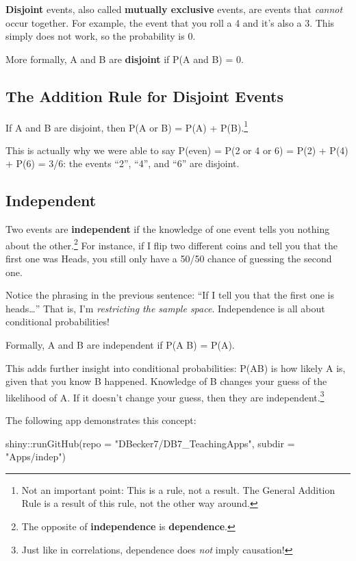 \documentclass[
  letterpaper,
  DIV=11,
  numbers=noendperiod]{scrreprt}
\newenvironment{Shaded}{\begin{snugshade}}{\end{snugshade}}
\newcommand{\AttributeTok}[1]{\textcolor[rgb]{0.40,0.45,0.13}{#1}}
\newcommand{\FunctionTok}[1]{\textcolor[rgb]{0.28,0.35,0.67}{#1}}
\newcommand{\NormalTok}[1]{\textcolor[rgb]{0.00,0.23,0.31}{#1}}
\newcommand{\SpecialCharTok}[1]{\textcolor[rgb]{0.37,0.37,0.37}{#1}}
\newcommand{\StringTok}[1]{\textcolor[rgb]{0.13,0.47,0.30}{#1}}
\begin{document}
\textbf{Disjoint} events, also called \textbf{mutually exclusive}
events, are events that \emph{cannot} occur together. For example, the
event that you roll a 4 and it's also a 3. This simply does not work, so
the probability is 0.

More formally, A and B are \textbf{disjoint} if P(A and B) = 0.

\hypertarget{the-addition-rule-for-disjoint-events}{%
\subsection{The Addition Rule for Disjoint
Events}\label{the-addition-rule-for-disjoint-events}}

If A and B are disjoint, then P(A or B) = P(A) + P(B).\footnote{Not an
  important point: This is a rule, not a result. The General Addition
  Rule is a result of this rule, not the other way around.}

This is actually why we were able to say P(even) = P(2 or 4 or 6) = P(2)
+ P(4) + P(6) = 3/6: the events ``2'', ``4'', and ``6'' are disjoint.

\hypertarget{independent}{%
\subsection{Independent}\label{independent}}

Two events are \textbf{independent} if the knowledge of one event tells
you nothing about the other.\footnote{The opposite of
  \textbf{independence} is \textbf{dependence}.} For instance, if I flip
two different coins and tell you that the first one was Heads, you still
only have a 50/50 chance of guessing the second one.

Notice the phrasing in the previous sentence: ``If I tell you that the
first one is heads\ldots{}'' That is, I'm \emph{restricting the sample
space}. Independence is all about conditional probabilities!

Formally, A and B are independent if P(A \textbar{} B) = P(A).

This adds further insight into conditional probabilities: P(A\textbar B)
is how likely A is, given that you know B happened. Knowledge of B
changes your guess of the likelihood of A. If it doesn't change your
guess, then they are independent.\footnote{Just like in correlations,
  dependence does \emph{not} imply causation!}

The following app demonstrates this concept:

\begin{Shaded}
\begin{Highlighting}[]
\NormalTok{shiny}\SpecialCharTok{::}\FunctionTok{runGitHub}\NormalTok{(}\AttributeTok{repo =} \StringTok{"DBecker7/DB7\_TeachingApps"}\NormalTok{, }
    \AttributeTok{subdir =} \StringTok{"Apps/indep"}\NormalTok{)}
\end{Highlighting}
\end{Shaded}
\end{document}
